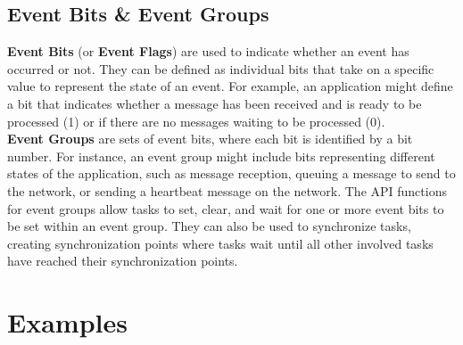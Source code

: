 \documentclass{article}
\begin{document}
\subsection{Event Bits \& Event Groups}
\textbf{Event Bits} (or \textbf{Event Flags}) are used to indicate whether an event has occurred or not. They can be defined as individual bits that take on a specific value to represent the state of an event. For example, an application might define a bit that indicates whether a message has been received and is ready to be processed (1) or if there are no messages waiting to be processed (0).\\[0.1cm]
\textbf{Event Groups} are sets of event bits, where each bit is identified by a bit number. For instance, an event group might include bits representing different states of the application, such as message reception, queuing a message to send to the network, or sending a heartbeat message on the network. The API functions for event groups allow tasks to set, clear, and wait for one or more event bits to be set within an event group. They can also be used to synchronize tasks, creating synchronization points where tasks wait until all other involved tasks have reached their synchronization points.



\section{Examples}
\end{document}
